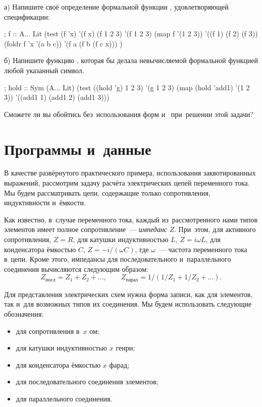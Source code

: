 \begin{Assignment}
а) Напишите своё определение формальной функции , удовлетворяющей спецификации:
\begin{Specification}
; f :: A... \arrow Lit
(test 
  (f 'x)                '(f x)
  (f 1 2 3)             '(f 1 2 3)
  (map f '(1 2 3))      '((f 1) (f 2) (f 3))
  (foldr f 'x '(a b c)) '(f a (f b (f c x))) )
\end{Specification}

б) Напишите функцию , которая бы делала невычисляемой формальной функцией любой указанный символ. 
\begin{Specification}
; hold :: Sym \arrow (A... \arrow Lit)
(test 
 ((hold 'g) 1 2 3)   '(g 1 2 3)
 (map (hold 'add1) '(1 2 3))  '((add1 1) (add1 2) (add1 3)))
\end{Specification}

Сможете ли вы обойтись без~использования форм  и~ при~решении этой задачи?
\end{Assignment}




\section{Программы и~данные}%
В качестве развёрнутого практического примера, использования заквотированных выражений, рассмотрим задачу расчёта электрических цепей переменного тока. Мы будем рассматривать цепи, содержащие только сопротивления, индуктивности и~ёмкости.

Как известно, в~случае переменного тока, каждый из~рассмотренного нами типов элементов имеет полное сопротивление~--- \emph{импеданс} $Z$. При~этом, для активного сопротивления, $Z = R$, для катушки индуктивностью $L$, $Z = i\omega L$, для конденсатора ёмкостью $C$, $Z = -i/(\omega C)$, где $\omega$~--- частота переменного тока в~цепи.
Кроме этого, импедансы для последовательного и~параллельного соединения вычисляются следующим образом:
$$Z_\text{посл} = Z_1 + Z_2 +...,\qquad  Z_\text{парал}= 1/(1/Z_1 + 1/Z_2 +...).$$

Для представления электрических схем нужна форма записи, как для элементов, так и~для возможных типов их соединения. Мы будем использовать следующие обозначения:

\begin{itemize}
 \item[]  для сопротивления в~$x$ ом;

 \item[]  для катушки индуктивностью $x$ генри;

 \item[]  для конденсатора ёмкостью $x$ фарад;

 \item[]  для последовательного соединения элементов;

 \item[]  для параллельного соединения.
\end{itemize}

